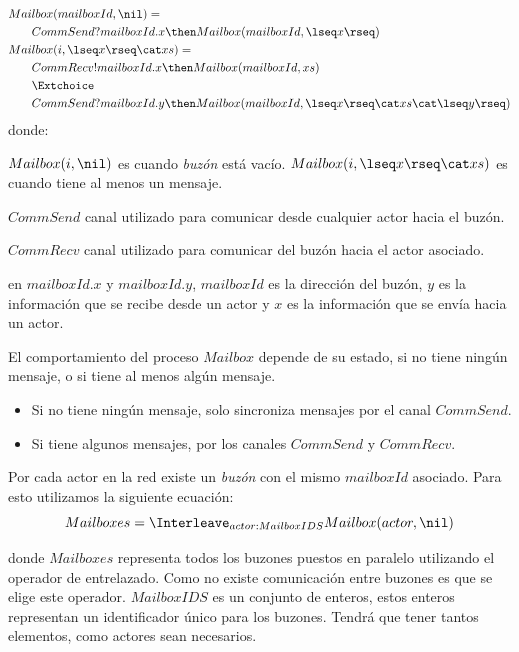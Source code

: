 \begin{align}\label{eq:mailbox}
\begin{split}
Mai&lbox(mailboxId, \nil) = {} \\
&CommSend?mailboxId.x \then Mailbox(mailboxId, \lseq x \rseq) \\
Mai&lbox(i, \lseq x \rseq \cat xs ) = {} \\ 
   &CommRecv!mailboxId.x \then Mailbox(mailboxId, xs) \\
   &\Extchoice \\
   &CommSend?mailboxId.y \then Mailbox(mailboxId, \lseq x \rseq \cat xs \cat \lseq y \rseq ) 
\end{split}
\end{align}
donde:
\begin{description}
 \item $Mailbox(i, \nil)$ es cuando \textit{buzón} está vacío. $Mailbox(i, \lseq x \rseq \cat xs )$ es cuando tiene al menos un mensaje. 
 \item $CommSend$ canal utilizado para comunicar desde cualquier actor hacia el buzón.
 \item $CommRecv$ canal utilizado para comunicar del buzón hacia el actor asociado.
 \item en $mailboxId.x$ y $mailboxId.y$, $mailboxId$ es la dirección del buzón, $y$ es la información que se recibe desde un actor y $x$ es la información que se envía hacia un actor.
 \end{description}
El comportamiento del proceso $Mailbox$ depende de su estado, si no tiene ningún mensaje, o si tiene al menos algún mensaje. 

\begin{itemize}
\item Si no tiene ningún mensaje, solo sincroniza mensajes por el canal $CommSend$.
\item Si tiene algunos mensajes, por los canales $CommSend$ y $CommRecv$.
\end{itemize}

Por cada actor en la red existe un \textit{buzón} con el mismo $mailboxId$ asociado. Para esto utilizamos la siguiente ecuación:
\begin{equation}\label{eq:mailbox}
Mailboxes = \Interleave_{ actor : MailboxIDS } Mailbox(actor, \nil) 
\end{equation}

donde $Mailboxes$ representa todos los buzones puestos en paralelo utilizando el operador de entrelazado. Como no existe comunicación entre buzones es que se elige este operador. $MailboxIDS$ es un conjunto de enteros, estos enteros representan un identificador único para los buzones. Tendrá que tener tantos elementos, como actores sean necesarios.

